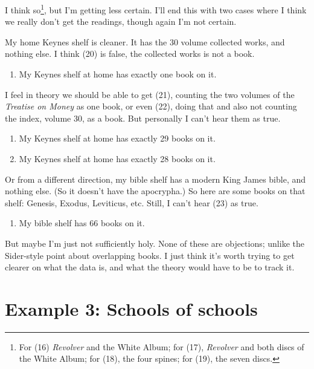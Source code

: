 \documentclass[
  11pt,
  letterpaper,
  DIV=11,
  numbers=noendperiod,
  twoside]{scrartcl}
\providecommand{\tightlist}{%
  \setlength{\itemsep}{0pt}\setlength{\parskip}{0pt}}
\begin{document}
I think so\footnote{For (16) \emph{Revolver} and the White Album; for
  (17), \emph{Revolver} and both discs of the White Album; for (18), the
  four spines; for (19), the seven discs.}, but I'm getting less
certain. I'll end this with two cases where I think we really don't get
the readings, though again I'm not certain.

My home Keynes shelf is cleaner. It has the 30 volume collected works,
and nothing else. I think (20) is false, the collected works is not a
book.

\begin{enumerate}
\def\labelenumi{(\arabic{enumi})}
\setcounter{enumi}{19}
\tightlist
\item
  My Keynes shelf at home has exactly one book on it.
\end{enumerate}

I feel in theory we should be able to get (21), counting the two volumes
of the \emph{Treatise on Money} as one book, or even (22), doing that
and also not counting the index, volume 30, as a book. But personally I
can't hear them as true.

\begin{enumerate}
\def\labelenumi{(\arabic{enumi})}
\setcounter{enumi}{20}
\tightlist
\item
  My Keynes shelf at home has exactly 29 books on it.
\item
  My Keynes shelf at home has exactly 28 books on it.
\end{enumerate}

Or from a different direction, my bible shelf has a modern King James
bible, and nothing else. (So it doesn't have the apocrypha.) So here are
some books on that shelf: Genesis, Exodus, Leviticus, etc. Still, I
can't hear (23) as true.

\begin{enumerate}
\def\labelenumi{(\arabic{enumi})}
\setcounter{enumi}{22}
\tightlist
\item
  My bible shelf has 66 books on it.
\end{enumerate}

But maybe I'm just not sufficiently holy. None of these are objections;
unlike the Sider-style point about overlapping books. I just think it's
worth trying to get clearer on what the data is, and what the theory
would have to be to track it.

\section{Example 3: Schools of
schools}\label{example-3-schools-of-schools}
\end{document}
